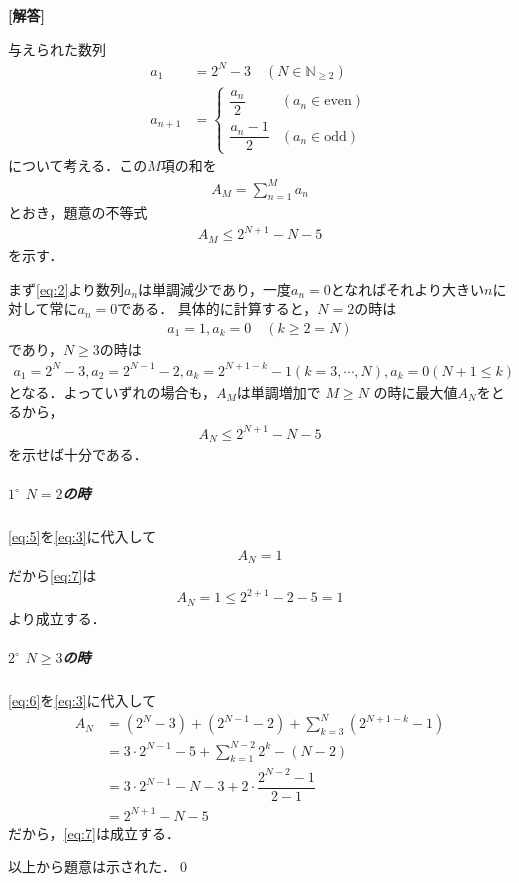 \documentclass[../../main.tex]{subfiles}
\begin{document}
\begin{oframed}
  
\end{oframed}

{\bf [解答]}

与えられた数列
\begin{align}
  a_1 &= 2^{N}-3 \quad (N\in\mathbb{N}_{\ge2}) \label{eq:1}\\
  a_{n+1}
  &=
  \begin{cases}
    \dfrac{a_n}{2} & (a_n\in\text{even}) \\
    \dfrac{a_n-1}{2} & (a_n\in\text{odd})
  \end{cases} \label{eq:2}
\end{align}
について考える．この$M$項の和を
\begin{align}
  A_M= \sum_{n=1}^Ma_n \label{eq:3}
\end{align}
とおき，題意の不等式
\begin{align}
  A_M \le 2^{N+1}-N-5 \label{eq:4}
\end{align}
を示す．

まず\cref{eq:2}より数列$a_n$は単調減少であり，一度$a_n=0$となればそれより大きい$n$に対して常に$a_n=0$である．
具体的に計算すると，$N=2$の時は
\begin{align}
  a_1 = 1, a_k = 0 \quad (k \ge 2=N) \label{eq:5}
\end{align}
であり，$N \ge 3$の時は
\begin{align}
  a_1 = 2^N-3, a_2 = 2^{N-1}-2, a_k=2^{N+1-k}-1 (k=3,\cdots,N), a_k = 0 (N+1 \le k) \label{eq:6}
\end{align}
となる．よっていずれの場合も，$A_M$は単調増加で $M \ge N$ の時に最大値$A_N$をとるから，
\begin{align}
  A_N \le 2^{N+1}-N-5 \label{eq:7}
\end{align}
を示せば十分である．

\subparagraph{$1^{\circ}$ $N=2$の時}

\cref{eq:5}を\cref{eq:3}に代入して
\begin{align}
  A_N = 1
\end{align}
だから\cref{eq:7}は
\begin{align}
  A_N = 1 \le 2^{2+1}-2-5 = 1
\end{align}
より成立する．

\subparagraph{$2^{\circ}$ $N \ge 3$の時}

\cref{eq:6}を\cref{eq:3}に代入して
\begin{align}
  A_N
  &=(2^N-3)+(2^{N-1}-2)+\sum_{k=3}^N(2^{N+1-k}-1)\\
  &=3\cdot2^{N-1}-5+\sum_{k=1}^{N-2}2^k-(N-2)\\
  &=3\cdot2^{N-1}-N-3+2\cdot\dfrac{2^{N-2}-1}{2-1}\\
  &=2^{N+1}-N-5
\end{align}
だから，\cref{eq:7}は成立する．
\casesend

以上から題意は示された．\qed

\newpage
\end{document}
